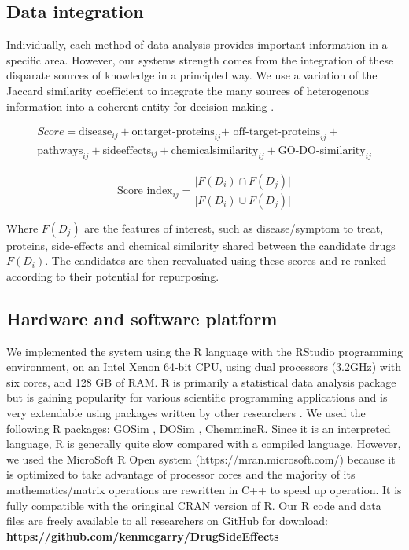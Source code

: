 \documentclass[preprint,11pt]{elsarticle}
\begin{document}
\subsection{Data integration}\label{integration}
Individually, each method of data analysis  provides important information in a specific area. However, our systems strength comes from the integration of these disparate sources of  knowledge in a principled way. We use  a variation of the Jaccard similarity coefficient to integrate the many sources of heterogenous information into a coherent entity for decision making \cite{BenHur2002}.

\begin{eqnarray}
        Score  = \text{disease}_{ij} + \text{ontarget-proteins}_{ij} \text{+ off-target-proteins}_{ij} + \nonumber \\
        \text{pathways}_{ij} + \text{sideeffects}_{ij} + \text{chemicalsimilarity}_{ij} +\text{GO-DO-similarity}_{ij}
\label{integrate}
\end{eqnarray}

\begin{equation}
        \text{Score index}_{ij} = \frac{\vert F(D_{i}) \cap F(D_j)\vert} {\vert F(D_{i}) \cup F(D_j) \vert}\nonumber
\label{associndex}
\end{equation}

Where $F(D_j)$ are the features of interest, such as disease/symptom to treat, proteins, side-effects and chemical similarity shared between the candidate drugs $F(D_i)$. The candidates are then reevaluated using these scores and re-ranked according to their potential for repurposing.

\subsection{Hardware and software platform}
We implemented the system using the R language with the RStudio programming environment, on an Intel Xenon 64-bit CPU, using dual processors (3.2GHz) with six cores, and 128 GB of RAM. R is primarily a statistical data analysis package but is gaining popularity for various scientific programming applications and is very extendable using packages written by other researchers \cite{RUser}.  We used the following R packages: GOSim \cite{Yu2015}, DOSim \cite{Yu2010}, ChemmineR\cite{Cao2008}. Since it is an interpreted language, R is generally quite slow compared with a compiled language. However, we used the MicroSoft R Open system (https://mran.microsoft.com/) because it is optimized to take advantage of processor cores and the majority of its mathematics/matrix operations are rewritten in C++ to speed up operation. It is fully compatible with the oringinal CRAN version of R. Our R code and data files are freely available to all researchers on GitHub for download:\\ {\bf https://github.com/kenmcgarry/DrugSideEffects}
\end{document}
